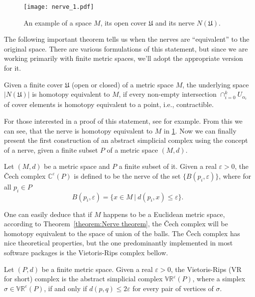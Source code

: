 \begin{figure}[h!]
  \centering
  \texttt{[image: nerve\_1.pdf]}
  \caption{An example of a space $M$, its open cover $\mathfrak{U}$ and its nerve $N(\mathfrak{U})$.}
  \label{fig:nerve_1}
\end{figure}

\noindent
The following important theorem tells us when the nerves are ``equivalent'' to the original space. There are various formulations of this statement, but since we are working primarily with finite metric spaces, we'll adopt the appropriate version for it.

\begin{theorem}
  Given a finite cover $\mathfrak{U}$ (open or closed) of a metric space $M$, the underlying space $|N(\mathfrak{U})|$ is homotopy equivalent to $M$, if every non-empty intersection $\cap_{i=0}^{k}U_{\alpha_{i}}$ of cover elements is homotopy equivalent to a point, i.e., contractible.
  \label{theorem:Nerve theorem}
\end{theorem}

For those interested in a proof of this statement, see \cite{Borsuk1948OnTI} for example. From this we can see, that the nerve is homotopy equivalent to $M$ in \ref{fig:nerve_1}. Now we can finally present the first construction of an abstract simplicial complex using the concept of a nerve, given a finite subset $P$ of a metric space $(M,d)$.

\begin{definition}
  Let $(M,d)$ be a metric space and $P$ a finite subset of it. Given a real $\varepsilon > 0$, the Čech complex $\mathbb{C}^{\varepsilon}(P)$ is defined to be the nerve of the set $\{B(p_{i},\varepsilon)\}$, where for all $p_{i} \in P$
  \begin{equation*}
    B(p_{i},\varepsilon) = \{x \in M \: \vert \: d(p_{i},x) \leq \varepsilon \}.
  \end{equation*}
\end{definition}

One can easily deduce that if $M$ happens to be a Euclidean metric space, according to Theorem~\ref{theorem:Nerve theorem}, the Čech complex will be homotopy equivalent to the space of union of the balls. The Čech complex has nice theoretical properties, but the one predominantly implemented in most software packages is the Vietoris-Rips complex bellow.

\begin{definition}
  Let $(P,d)$ be a finite metric space. Given a real $\varepsilon>0$, the Vietoris-Rips (VR for short) complex is the abstract simplicial complex $\mathbb{VR}^{\varepsilon}(P)$, where a simplex $\sigma \in \mathbb{VR}^{\varepsilon}(P)$, if and only if $d(p,q) \leq 2\varepsilon$ for every pair of vertices of $\sigma$.
\end{definition}

